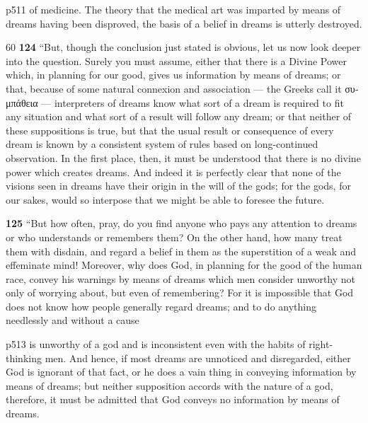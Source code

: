 p511 of medicine. The theory that the medical art was imparted by means of dreams having been disproved, the basis of a belief in dreams is utterly destroyed.

60
\textbf{124} ``But, though the conclusion just stated is obvious, let us now look deeper into the question. Surely you must assume, either that there is a Divine Power which, in planning for our good, gives us information by means of dreams; or that, because of some natural connexion and association \texthebrew{—} the Greeks call it \textgreek{συμπάθεια} \texthebrew{—} interpreters of dreams know what sort of a dream is required to fit any situation and what sort of a result will follow any dream; or that neither of these suppositions is true, but that the usual result or consequence of every dream is known by a consistent system of rules based on long-continued observation. In the first place, then, it must be understood that there is no divine power which creates dreams. And indeed it is perfectly clear that none of the visions seen in dreams have their origin in the will of the gods; for the gods, for our sakes, would so interpose that we might be able to foresee the future.

\textbf{125} ``But how often, pray, do you find anyone who pays any attention to dreams or who understands or remembers them? On the other hand, how many treat them with disdain, and regard a belief in them as the superstition of a weak and effeminate mind! Moreover, why does God, in planning for the good of the human race, convey his warnings by means of dreams which men consider unworthy not only of worrying about, but even of remembering? For it is impossible that God does not know how people generally regard dreams; and to do anything needlessly and without a cause

p513 is unworthy of a god and is inconsistent even with the habits of right-thinking men. And hence, if most dreams are unnoticed and disregarded, either God is ignorant of that fact, or he does a vain thing in conveying information by means of dreams; but neither supposition accords with the nature of a god, therefore, it must be admitted that God conveys no information by means of dreams.

